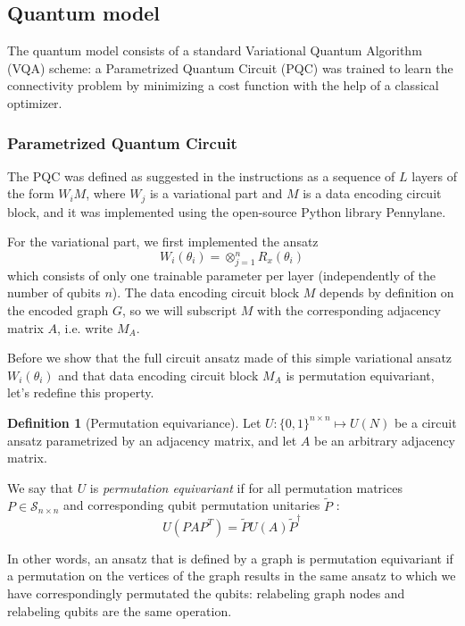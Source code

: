 \documentclass{article}
\theoremstyle{definition}
\newtheorem{definition}{Definition}
\theoremstyle{plain}
\begin{document}
\subsection{Quantum model}

The quantum model consists of a standard Variational Quantum Algorithm (VQA) scheme: a Parametrized Quantum Circuit (PQC) was trained to learn the connectivity problem by minimizing a cost function with the help of a classical optimizer.

\subsubsection*{Parametrized Quantum Circuit}

The PQC was defined as suggested in the instructions as a sequence of $L$ layers of the form $W_iM$, where $W_j$ is a variational part and $M$ is a data encoding circuit block, and it was implemented using the open-source Python library Pennylane.

For the variational part, we first implemented the ansatz \[ W_i(\theta_i) = \otimes_{j=1}^n R_x(\theta_i) \] which consists of only one trainable parameter per layer (independently of the number of qubits $n$). The data encoding circuit block $M$ depends by definition on the encoded graph $G$, so we will subscript $M$ with the corresponding adjacency matrix $A$, i.e. write $M_A$. 

Before we show that the full circuit ansatz made of this simple variational ansatz $W_i(\theta_i)$ and that data encoding circuit block $M_A$ is permutation equivariant, let's redefine this property.

\begin{definition}[Permutation equivariance]
Let $U : \{0,1\}^{n \times n} \mapsto U(N)$ be a circuit ansatz parametrized by an adjacency matrix, and let $A$ be an arbitrary adjacency matrix.

We say that $U$ is \textit{permutation equivariant} if for all permutation matrices $P \in \mathcal{S}_{n \times n}$ and corresponding qubit permutation unitaries $\tilde{P}$ :
\[ U(PAP^T) = \tilde{P}U(A)\tilde{P}^{\dagger}\]
    
In other words, an ansatz that is defined by a graph is permutation equivariant if a permutation on the vertices of the graph results in the same ansatz to which we have correspondingly permutated the qubits: relabeling graph nodes and relabeling qubits are the same operation.
\end{definition}
\end{document}
